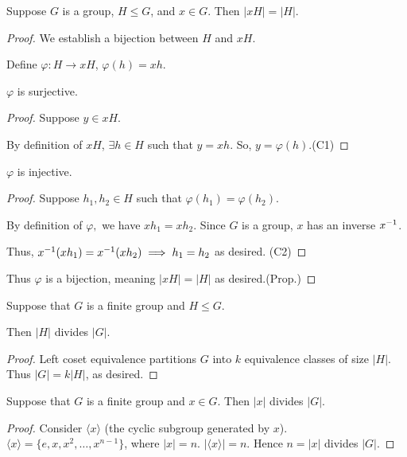 \documentclass[notes.tex]{subfiles}
\begin{document}
\begin{proposition}
	Suppose $G$ is a group, $H\le G$, and $x\in G$. Then $|xH| = |H|$.
\end{proposition}
\begin{proof}
	We establish a bijection between $H$ and $xH$.

	Define $\varphi:H\to xH$, $\varphi(h) = xh$.

	\begin{claim}[1]
	 	$\varphi$ is surjective.
	 \end{claim}
	 \begin{proof}
	 	Suppose $y \in xH$.

	 	By definition of $xH$, $\exists h\in H$ such that $y=xh$. So, $y=\varphi(h)$.\qedhere(C1)
	 \end{proof}
	 \begin{claim}[2]
	 	$\varphi$ is injective.
	 \end{claim}
	 \begin{proof}
	 	Suppose $h_1, h_2\in H$ such that $\varphi(h_1) = \varphi(h_2)$.

		By definition of $\varphi,$ we have $xh_1 = xh_2$. Since $G$ is a group, $x$ has an inverse ${x}^{-1}$.

		Thus, ${x}^{-1}(xh_1) = {x}^{-1}(xh_2)\implies h_1=h_2$ as desired. \qedhere(C2)
	 \end{proof}

	Thus $\varphi$ is a bijection, meaning $|xH| = |H|$ as desired.\qedhere(Prop.)
\end{proof}

\begin{theorem}\label{lagrange}
	Suppose that $G$ is a finite group and $H\le G$.

	Then $|H|$ divides $|G|$.
\end{theorem}
\begin{proof}
	Left coset equivalence partitions $G$ into $k$ equivalence classes of size $|H|$. \\
\hspace{3em}
	Thus $|G| = k|H|$, as desired.
\end{proof}

\begin{corollary}
	Suppose that $G$ is a finite group and $x\in G$. Then $|x|$ divides $|G|$.
\end{corollary}

\begin{proof}
	Consider $\langle x\rangle$ (the cyclic subgroup generated by $x$).
	$\langle x\rangle = \{e, x, x^2, \ldots, x^{n-1}\}$, where $|x| = n$. $|\langle x\rangle| = n$. Hence $n = |x|$ divides $|G|$.
\end{proof}
\end{document}
